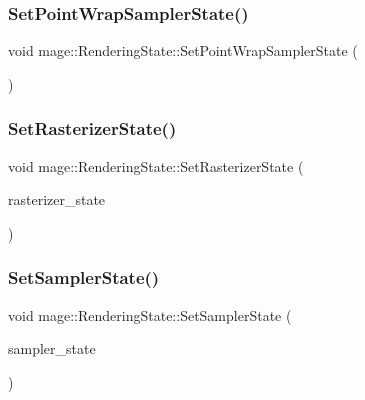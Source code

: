 \hypertarget{structmage_1_1_rendering_state_ab8cebd05d1b01ec22f311aa0f1c1dc7e}{}\label{structmage_1_1_rendering_state_ab8cebd05d1b01ec22f311aa0f1c1dc7e} 
\subsubsection{\texorpdfstring{Set\+Point\+Wrap\+Sampler\+State()}{SetPointWrapSamplerState()}}
{\footnotesize\ttfamily void mage\+::\+Rendering\+State\+::\+Set\+Point\+Wrap\+Sampler\+State (\begin{DoxyParamCaption}{ }\end{DoxyParamCaption})}

\hypertarget{structmage_1_1_rendering_state_a067596b397a607f5016b2f8ef9e7dd2e}{}\label{structmage_1_1_rendering_state_a067596b397a607f5016b2f8ef9e7dd2e} 
\subsubsection{\texorpdfstring{Set\+Rasterizer\+State()}{SetRasterizerState()}}
{\footnotesize\ttfamily void mage\+::\+Rendering\+State\+::\+Set\+Rasterizer\+State (\begin{DoxyParamCaption}\item[{I\+D3\+D11\+Rasterizer\+State $\ast$}]{rasterizer\+\_\+state }\end{DoxyParamCaption})}

\hypertarget{structmage_1_1_rendering_state_ab0c8450e46a9172871e5a40f2303bfb2}{}\label{structmage_1_1_rendering_state_ab0c8450e46a9172871e5a40f2303bfb2} 
\subsubsection{\texorpdfstring{Set\+Sampler\+State()}{SetSamplerState()}}
{\footnotesize\ttfamily void mage\+::\+Rendering\+State\+::\+Set\+Sampler\+State (\begin{DoxyParamCaption}\item[{I\+D3\+D11\+Sampler\+State $\ast$}]{sampler\+\_\+state }\end{DoxyParamCaption})}

